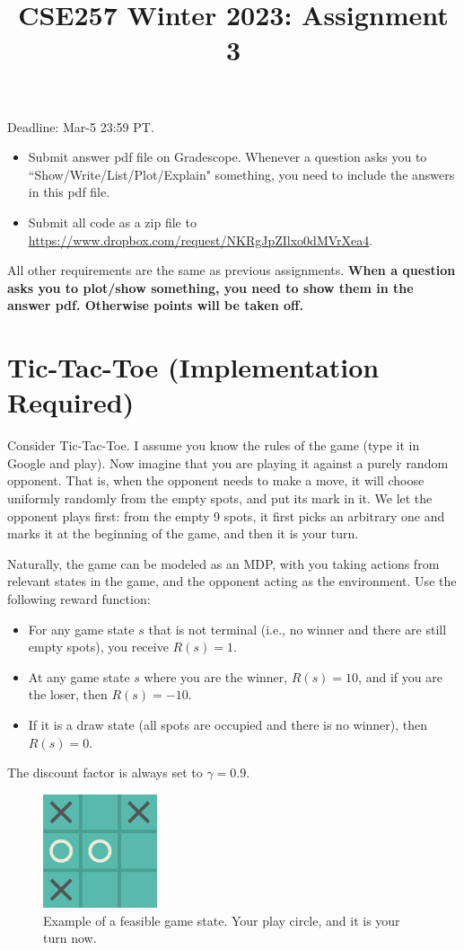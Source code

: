 \documentclass{article}
\title{CSE257 Winter 2023: Assignment 3}
\author{}
\date{}
\begin{document}
\maketitle
\linenumbers
Deadline: Mar-5 23:59 PT. 
\begin{itemize}
    \item Submit answer pdf file on Gradescope. Whenever a question asks you to ``Show/Write/List/Plot/Explain" something, you need to include the answers in this pdf file. 
    \item Submit all code as a zip file to \url{https://www.dropbox.com/request/NKRgJpZIlxo0dMVrXea4}.  
\end{itemize}
All other requirements are the same as previous assignments. {\color{red}\bf When a question asks you to plot/show something, you need to show them in the answer pdf. Otherwise points will be taken off.}

\section{Tic-Tac-Toe (Implementation Required)}

Consider Tic-Tac-Toe. I assume you know the rules of the game (type it in Google and play). Now imagine that you are playing it against a purely random opponent. That is, when the opponent needs to make a move, it will choose uniformly randomly from the empty spots, and put its mark in it. We let the opponent plays first: from the empty 9 spots, it first picks an arbitrary one and marks it at the beginning of the game, and then it is your turn. 

Naturally, the game can be modeled as an MDP, with you taking actions from relevant states in the game, and the opponent acting as the environment. Use the following reward function: 
\begin{itemize}
    \item For any game state $s$ that is not terminal (i.e., no winner and there are still empty spots), you receive $R(s)=1$. 
    \item At any game state $s$ where you are the winner, $R(s)=10$, and if you are the loser, then $R(s)=-10$. 
    \item If it is a draw state (all spots are occupied and there is no winner), then $R(s)=0$. 
\end{itemize}
The discount factor is always set to $\gamma=0.9$. 

\begin{figure}[h]
    \centering
    \includegraphics[width=0.3\textwidth]{tic-tac-toe.png}
    \caption{Example of a feasible game state. Your play circle, and it is your turn now.}
    \label{fig:my_label}
\end{figure}
\end{document}
